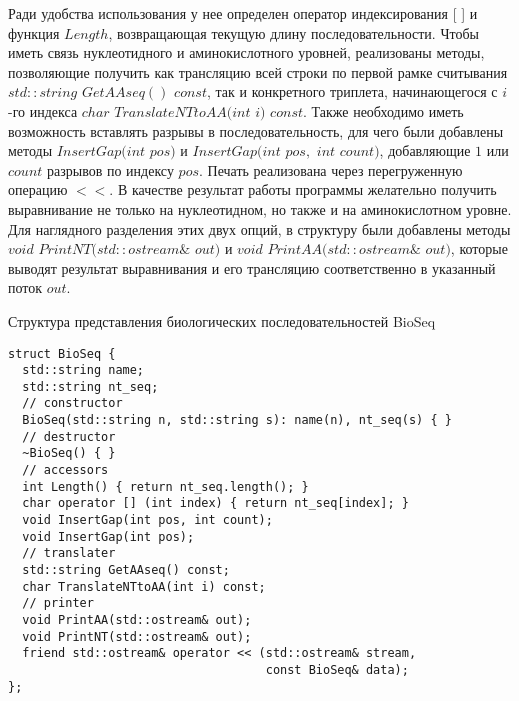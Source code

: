 Ради удобства использования у нее определен оператор индексирования [ ] и функция $Length$, возвращающая текущую длину последовательности. Чтобы иметь связь нуклеотидного и аминокислотного уровней, реализованы методы, позволяющие получить как трансляцию всей строки по первой рамке считывания $std::string$ $GetAAseq()$ $const$, так и конкретного триплета, начинающегося с $i$-го индекса $char$ $TranslateNTtoAA(int$ $i)$ $const$. Также необходимо иметь возможность вставлять разрывы в последовательность, для чего были добавлены методы $InsertGap(int$ $pos)$ и $InsertGap(int$ $pos,$ $int$ $count)$, добавляющие $1$ или $count$ разрывов по индексу $pos$. Печать реализована через перегруженную операцию $<<$. В качестве результат работы программы желательно получить выравнивание не только на нуклеотидном, но также и на аминокислотном уровне. Для наглядного разделения этих двух опций, в структуру были добавлены методы $void$ $PrintNT(std::ostream\&$ $out)$ и $void$ $PrintAA(std::ostream\&$ $out)$, которые выводят результат выравнивания и его трансляцию соответственно в указанный поток $out$.
\begin{algorithm}
	\caption{Структура представления биологических последовательностей BioSeq} \label{lst:BioSeq}
	\begin{lstlisting}
struct BioSeq {
  std::string name;
  std::string nt_seq;
  // constructor
  BioSeq(std::string n, std::string s): name(n), nt_seq(s) { }
  // destructor
  ~BioSeq() { }
  // accessors
  int Length() { return nt_seq.length(); }
  char operator [] (int index) { return nt_seq[index]; }
  void InsertGap(int pos, int count);
  void InsertGap(int pos);
  // translater
  std::string GetAAseq() const;
  char TranslateNTtoAA(int i) const;
  // printer
  void PrintAA(std::ostream& out);
  void PrintNT(std::ostream& out);
  friend std::ostream& operator << (std::ostream& stream,
                                    const BioSeq& data);
};
	\end{lstlisting}
\end{algorithm}

